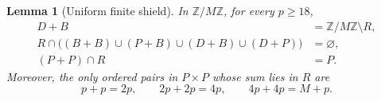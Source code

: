 \documentclass[11pt,letterpaper]{article}
\newtheorem{lemma}[theorem]{Lemma}
\newcommand{\ZM}{\mathbb{Z}/M\mathbb{Z}}
\begin{document}
\begin{lemma}[Uniform finite shield]\label{lem:shield}
In $\ZM$, for every \(p\geq18\),
\begin{align}
D+B&=\ZM\setminus R,                                      \label{eq:cover-mod}\\
R\cap\bigl((B+B)\cup(P+B)\cup(D+B)\cup(D+P)\bigr)
&=\varnothing,                                             \label{eq:avoid-mod}\\
(P+P)\cap R&=P.                                            \label{eq:PP-mod}
\end{align}
Moreover, the only ordered pairs in \(P\times P\) whose sum lies in \(R\) are
\begin{equation}\label{eq:diagonal-pairs}
p+p=2p,
\qquad
2p+2p=4p,
\qquad
4p+4p=M+p.
\end{equation}
\end{lemma}
\end{document}
